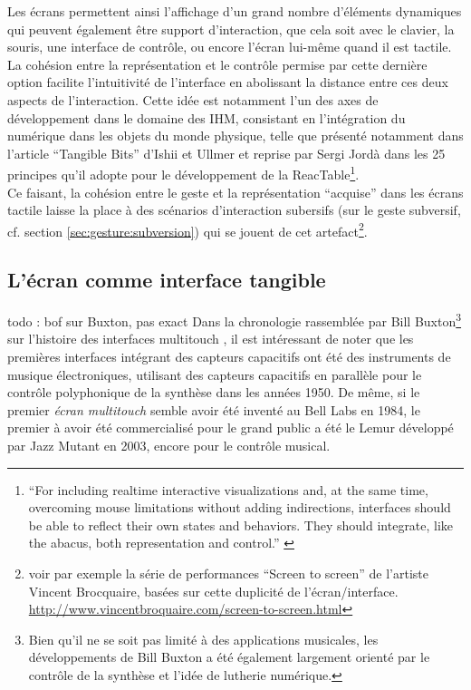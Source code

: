 \indent Les écrans permettent ainsi l'affichage d'un grand nombre d'éléments dynamiques qui peuvent également être support d'interaction, que cela soit avec le clavier, la souris, une interface de contrôle, ou encore l'écran lui-même quand il est tactile. La cohésion entre la représentation et le contrôle permise par cette dernière option facilite l'intuitivité de l'interface en abolissant la distance entre ces deux aspects de l'interaction. Cette idée est notamment l'un des axes de développement dans le domaine des \gls{IHM}, consistant en l'intégration du numérique dans les objets du monde physique, telle que présenté notamment dans l'article ``Tangible Bits'' d'Ishii et Ullmer \cite{ishii_tangible_1997} et reprise par Sergi Jordà dans les 25 principes qu'il adopte pour le développement de la ReacTable\footnote{``For including realtime interactive visualizations and, at the same time, overcoming
mouse limitations without adding indirections, interfaces should be able to reflect their own states and behaviors. They should integrate, like the abacus, both representation and control.'' \cite{jorda_digital_2005}}.\\

\indent Ce faisant, la cohésion entre le geste et la représentation ``acquise'' dans les écrans tactile laisse la place à des scénarios d'interaction subersifs (sur le geste subversif, cf. section \ref{sec:gesture:subversion}) qui se jouent de cet artefact\footnote{voir par exemple la série de performances ``Screen to screen'' de l'artiste Vincent Brocquaire, basées sur cette duplicité de l'écran/interface. \url{http://www.vincentbroquaire.com/screen-to-screen.html}}. 

\subsection{L'écran comme interface tangible}

todo : bof sur Buxton, pas exact
\noindent Dans la chronologie rassemblée par Bill Buxton\footnote{Bien qu'il ne se soit pas limité à des applications musicales, les développements de Bill Buxton a été également largement orienté par le contrôle de la synthèse et l'idée de lutherie numérique.} sur l'histoire des interfaces multitouch \cite{buxton_multi-touch_2007}, il est intéressant de noter que les premières interfaces intégrant des capteurs capacitifs ont été des instruments de musique électroniques, utilisant des capteurs capacitifs en parallèle pour le contrôle polyphonique de la synthèse dans les années 1950. De même, si le premier \textit{écran multitouch} semble avoir été inventé au Bell Labs en 1984, le premier à avoir été commercialisé pour le grand public a été le Lemur développé par Jazz Mutant en 2003, encore pour le contrôle musical.

